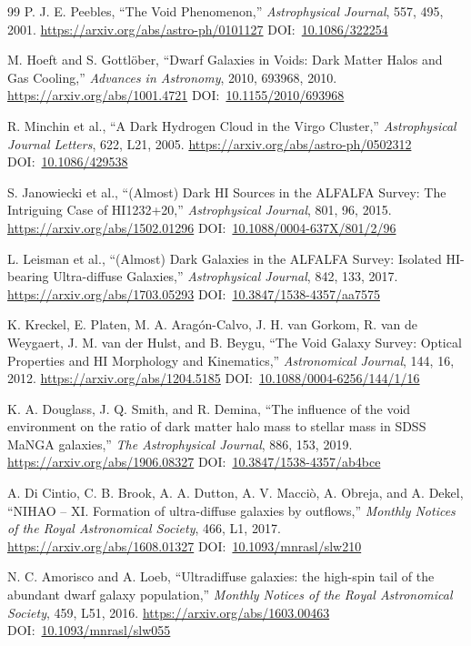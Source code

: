 \documentclass[10pt,onecolumn]{article}
\newcommand{\doi}[1]{DOI:~\href{https://doi.org/#1}{#1}}
\begin{document}
\begin{thebibliography}{99}
P. J. E. Peebles,
``The Void Phenomenon,''
\emph{Astrophysical Journal}, 557, 495, 2001.
\url{https://arxiv.org/abs/astro-ph/0101127}
\doi{10.1086/322254}

M. Hoeft and S. Gottl\"ober,
``Dwarf Galaxies in Voids: Dark Matter Halos and Gas Cooling,''
\emph{Advances in Astronomy}, 2010, 693968, 2010.
\url{https://arxiv.org/abs/1001.4721}
\doi{10.1155/2010/693968}

R. Minchin et al.,
``A Dark Hydrogen Cloud in the Virgo Cluster,''
\emph{Astrophysical Journal Letters}, 622, L21, 2005.
\url{https://arxiv.org/abs/astro-ph/0502312}
\doi{10.1086/429538}

S. Janowiecki et al.,
``(Almost) Dark HI Sources in the ALFALFA Survey: The Intriguing Case of HI1232+20,''
\emph{Astrophysical Journal}, 801, 96, 2015.
\url{https://arxiv.org/abs/1502.01296}
\doi{10.1088/0004-637X/801/2/96}

L. Leisman et al.,
``(Almost) Dark Galaxies in the ALFALFA Survey: Isolated HI-bearing Ultra-diffuse Galaxies,''
\emph{Astrophysical Journal}, 842, 133, 2017.
\url{https://arxiv.org/abs/1703.05293}
\doi{10.3847/1538-4357/aa7575}

K. Kreckel, E. Platen, M. A. Arag\'on-Calvo, J. H. van Gorkom, R. van de Weygaert, J. M. van der Hulst, and B. Beygu,
``The Void Galaxy Survey: Optical Properties and HI Morphology and Kinematics,''
\emph{Astronomical Journal}, 144, 16, 2012.
\url{https://arxiv.org/abs/1204.5185}
\doi{10.1088/0004-6256/144/1/16}

K. A. Douglass, J. Q. Smith, and R. Demina,
``The influence of the void environment on the ratio of dark matter halo mass to stellar mass in SDSS MaNGA galaxies,''
\emph{The Astrophysical Journal}, 886, 153, 2019.
\url{https://arxiv.org/abs/1906.08327}
\doi{10.3847/1538-4357/ab4bce}

A. Di Cintio, C. B. Brook, A. A. Dutton, A. V. Macci\`o, A. Obreja, and A. Dekel,
``NIHAO -- XI. Formation of ultra-diffuse galaxies by outflows,''
\emph{Monthly Notices of the Royal Astronomical Society}, 466, L1, 2017.
\url{https://arxiv.org/abs/1608.01327}
\doi{10.1093/mnrasl/slw210}

N. C. Amorisco and A. Loeb,
``Ultradiffuse galaxies: the high-spin tail of the abundant dwarf galaxy population,''
\emph{Monthly Notices of the Royal Astronomical Society}, 459, L51, 2016.
\url{https://arxiv.org/abs/1603.00463}
\doi{10.1093/mnrasl/slw055}


\end{thebibliography}
\end{document}

